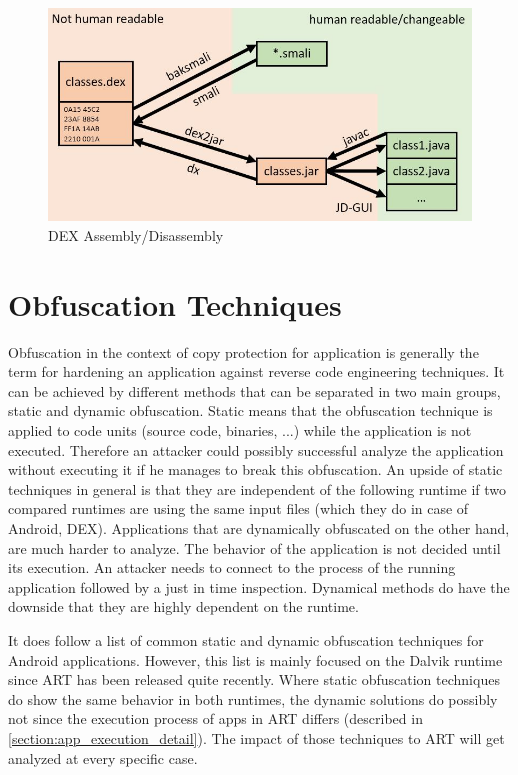 \begin{figure}[htb]
  \includegraphics[width=\textwidth]{figures/dex_disassembly}
  \caption[DEX Assembly/Disassembly]{DEX Assembly/Disassembly}
  \label{fig:dex_disassembly}
\end{figure}


\section{Obfuscation Techniques}\label{section:obfuscation_techniques}
Obfuscation in the context of copy protection for application
is generally the term for hardening an application against
reverse code engineering techniques. It can be achieved by different methods
that can be separated in two main groups, static and dynamic obfuscation.
Static means that the obfuscation technique is applied to code units (source
code, binaries, ...) while the application is not executed. Therefore an
attacker could possibly successful analyze the application without executing it
if he manages to break this obfuscation. An upside of static techniques in general is that they are independent of the following runtime if two compared runtimes are using the same input files (which they do in case of Android, DEX).
Applications that are dynamically obfuscated on the other hand, are much harder to analyze. The behavior
of the application is not decided until its execution. An attacker needs to connect to the process of the running application followed by a just in time inspection. Dynamical methods do have the downside that they are highly dependent on the runtime.

It does follow a list of common static and dynamic obfuscation techniques
for Android applications. However, this list is mainly focused on
the Dalvik runtime since ART has been released quite recently.
Where static obfuscation techniques do show the same behavior in both
runtimes, the dynamic solutions do possibly not since the execution process
of apps in ART differs (described in \autoref{section:app_execution_detail}).
The impact of those techniques to ART will get analyzed at every specific case.



